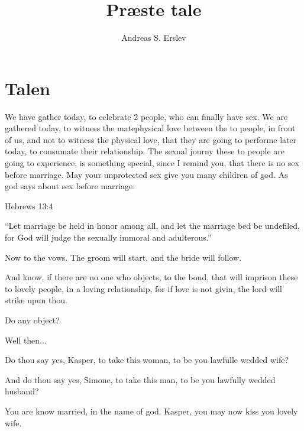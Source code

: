 \documentclass[]{article}
\title{Præste tale}
\author{Andreas S. Erslev}
\begin{document}
\maketitle

\section{Talen}

We have gather today, to celebrate 2 people, who can finally have sex. We are gathered today, to witness the matephysical love between the to people, in front of us, and not to witness the physical love, that they are going to performe later today, to consumate their relationship. The sexual journy these to people are going to experience, is something special, since I remind you, that there is no sex before marriage. May your unprotected sex give you many children of god.
As god says about sex before marriage:

Hebrews 13:4

“Let marriage be held in honor among all, and let the marriage bed be undefiled, for God will judge the sexually immoral and adulterous.”

Now to the vows. The groom will start, and the bride will follow.

And know, if there are no one who objects, to the bond, that will imprison these to lovely people, in a loving relationship, for if love is not givin, the lord will strike upun thou.

Do any object?

Well then...

Do thou say yes, Kasper, to take this woman, to be you lawfulle wedded wife? 

And do thou say yes, Simone, to take this man, to be you lawfully wedded husband?

You are know married, in the name of god. Kasper, you may now kiss you lovely wife.
\end{document}
